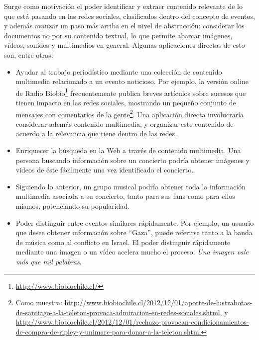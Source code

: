    Surge como motivación el poder identificar y extraer contenido
   relevante de lo que está pasando en las redes sociales,
   clasificados dentro del concepto de eventos, y además avanzar un
   paso más arriba en el nivel de abstracción: considerar los
   documentos no por su contenido textual, lo que permite abarcar
   imágenes, vídeos, sonidos y multimedios en general. Algunas
   aplicaciones directas de esto son, entre otras:

\begin{itemize}
\item Ayudar al trabajo periodístico mediante una colección de
     contenido multimedia relacionado a un evento noticioso. Por
     ejemplo, la versión online de Radio
     Biobío\footnote{\href{http://www.biobiochile.cl/}{http://www.biobiochile.cl/} } frecuentemente publica
     breves artículos sobre sucesos que tienen impacto en las redes
     sociales, mostrando un pequeño conjunto de mensajes con
     comentarios de la gente\footnote{Como muestra: \href{http://www.biobiochile.cl/2012/12/01/aporte-de-lustrabotas-de-santiago-a-la-teleton-provoca-admiracion-en-redes-sociales.shtml}{http://www.biobiochile.cl/2012/12/01/aporte-de-lustrabotas-de-santiago-a-la-teleton-provoca-admiracion-en-redes-sociales.shtml}, y \href{http://www.biobiochile.cl/2012/12/01/rechazo-provocan-condicionamientos-de-compra-de-ripley-y-unimarc-para-donar-a-la-teleton.shtml}{http://www.biobiochile.cl/2012/12/01/rechazo-provocan-condicionamientos-de-compra-de-ripley-y-unimarc-para-donar-a-la-teleton.shtml} }.
     Una aplicación directa involucraría
     considerar además contenido multimedia, y organizar este
     contenido de acuerdo a la relevancia que tiene dentro de las
     redes.
\item Enriquecer la búsqueda en la Web a través de contenido
     multimedia. Una persona buscando información sobre un concierto
     podría obtener imágenes y vídeos de éste fácilmente una vez
     identificado el concierto.
\item Siguiendo lo anterior, un grupo musical podría obtener toda la
     información multimedia asociada a su concierto, tanto para sus
     fans como para ellos mismos, potenciando su popularidad.
\item Poder distinguir entre eventos similares rápidamente. Por
     ejemplo, un usuario que desee obtener información sobre ``Gaza'',
     puede referirse tanto a la banda de música como al conflicto en
     Israel. El poder distinguir rápidamente mediante una imagen o un
     vídeo acelera mucho el proceso. \emph{Una imagen vale más que mil palabras}.
\end{itemize}

